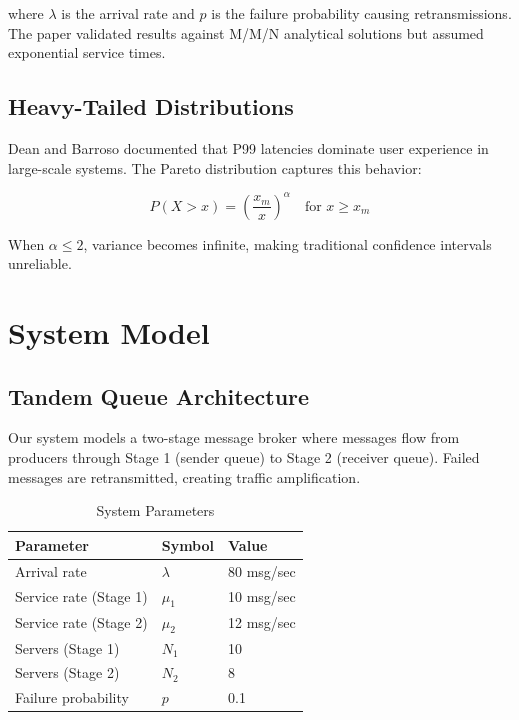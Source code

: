 \documentclass[conference,twocolumn]{IEEEtran}
\begin{document}
where $\lambda$ is the arrival rate and $p$ is the failure probability causing retransmissions. The paper validated results against M/M/N analytical solutions but assumed exponential service times.

\subsection{Heavy-Tailed Distributions}

Dean and Barroso \cite{dean2013} documented that P99 latencies dominate user experience in large-scale systems. The Pareto distribution captures this behavior:

\begin{equation}
P(X > x) = \left(\frac{x_m}{x}\right)^\alpha \quad \text{for } x \geq x_m
\end{equation}

When $\alpha \leq 2$, variance becomes infinite, making traditional confidence intervals unreliable.

\section{System Model}

\subsection{Tandem Queue Architecture}

Our system models a two-stage message broker where messages flow from producers through Stage 1 (sender queue) to Stage 2 (receiver queue). Failed messages are retransmitted, creating traffic amplification.

\begin{table}[h]
\centering
\caption{System Parameters}
\begin{tabular}{lll}
\toprule
\textbf{Parameter} & \textbf{Symbol} & \textbf{Value} \\
\midrule
Arrival rate & $\lambda$ & 80 msg/sec \\
Service rate (Stage 1) & $\mu_1$ & 10 msg/sec \\
Service rate (Stage 2) & $\mu_2$ & 12 msg/sec \\
Servers (Stage 1) & $N_1$ & 10 \\
Servers (Stage 2) & $N_2$ & 8 \\
Failure probability & $p$ & 0.1 \\
\bottomrule
\end{tabular}
\label{tab:params}
\end{table}
\end{document}
